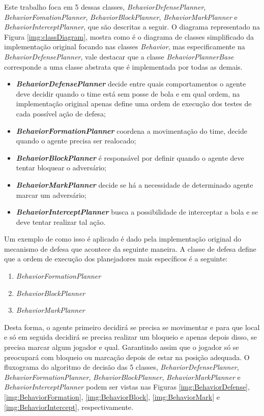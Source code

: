 Este trabalho foca em 5 dessas classes, \textit{BehaviorDefensePlanner},
\textit{BehaviorFomationPlanner}, \textit{BehaviorBlockPlanner},
\textit{BehaviorMarkPlanner} e \textit{BehaviorInterceptPlanner}, que são
descritas a seguir. O diagrama representado na Figura \ref{img:classDiagram},
mostra como é o diagrama de classes simplificado da implementação original
focando nas classes \textit{Behavior}, mas especificamente na
\textit{BehaviorDefensePlanner}, vale destacar que a classe
\textit{BehaviorPlannerBase} corresponde a uma classe abstrata que é
implementada por todas as demais.

\begin{itemize}
    \item \textbf{\textit{BehaviorDefensePlanner}} decide entre quais
    comportamentos o agente deve decidir quando o time está sem posse de bola e
    em qual ordem, na implementação original apenas define uma ordem de execução
    dos testes de cada possível ação de defesa;
    \item \textbf{\textit{BehaviorFormationPlanner}} coordena a movimentação do
    time, decide quando o agente precisa ser realocado;
    \item \textbf{\textit{BehaviorBlockPlanner}} é responsável por definir
    quando o agente deve tentar bloquear o adversário;
    \item \textbf{\textit{BehaviorMarkPlanner}} decide se há a necessidade de
    determinado agente marcar um adversário;
    \item \textbf{\textit{BehaviorInterceptPlanner}} busca a possibilidade de
    interceptar a bola e se deve tentar realizar tal ação.
\end{itemize}


Um exemplo de como isso é aplicado é dado pela implementação original do
mecanismo de defesa que acontece da seguinte maneira. A classe de defesa define
que a ordem de execução dos planejadores mais específicos é a seguinte:

\begin{enumerate}
    \item \textit{BehaviorFormationPlanner}
    \item \textit{BehaviorBlockPlanner}
    \item \textit{BehaviorMarkPlanner}
\end{enumerate}

Desta forma, o agente primeiro decidirá se precisa se movimentar e para que
local e só em seguida decidirá se precisa realizar um bloqueio e apenas depois
disso, se precisa marcar algum jogador e qual. Garantindo assim que o
jogador só se preocupará com bloqueio ou marcação depois de estar na posição
adequada. O fluxograma do algoritmo de decisão das 5 classes,
\textit{BehaviorDefensePlanner}, \textit{BehaviorFormationPlanner},
\textit{BehaviorBlockPlanner}, \textit{BehaviorMarkPlanner}
e \textit{BehaviorInterceptPlanner} podem ser vistas nas
Figuras \ref{img:BehaviorDefense}, \ref{img:BehaviorFormation},
\ref{img:BehaviorBlock}, \ref{img:BehaviorMark} e \ref{img:BehaviorIntercept}, respectivamente.

